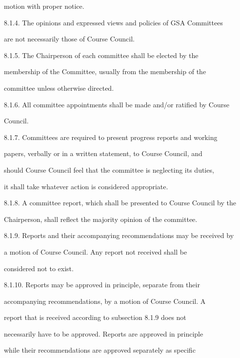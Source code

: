 \documentclass{article}
\begin{document}
motion with proper notice.  



8.1.4. The  opinions  and  expressed  views  and  policies  of  GSA  Committees  

are not necessarily those of Course Council.  



8.1.5. The      Chairperson      of    each    committee       shall   be    elected    by    the  

membership  of  the  Committee,  usually  from  the  membership  of  the  

committee unless otherwise directed.  



8.1.6. All committee  appointments  shall  be  made  and/or  ratified  by  Course  

Council.  



8.1.7. Committees  are  required  to  present  progress  reports  and  working  

papers,  verbally  or  in  a  written  statement,  to  Course  Council,  and  

should Course Council feel that the committee is neglecting its duties,  

it shall take whatever action is considered appropriate.  



8.1.8. A committee report, which shall be presented to Course Council by the  

Chairperson, shall reflect the majority opinion of the committee.  



8.1.9. Reports and their accompanying recommendations may be received by  

a   motion   of   Course   Council.   Any   report   not   received   shall   be  

considered not to exist.  



8.1.10.     Reports     may     be   approved      in   principle,     separate    from     their  

accompanying  recommendations,  by  a  motion  of  Course  Council.  A  

report   that   is   received   according   to   subsection   8.1.9   does   not  

necessarily  have  to  be  approved.  Reports  are  approved  in  principle  

while   their   recommendations   are  approved   separately   as   specific  
\end{document}
